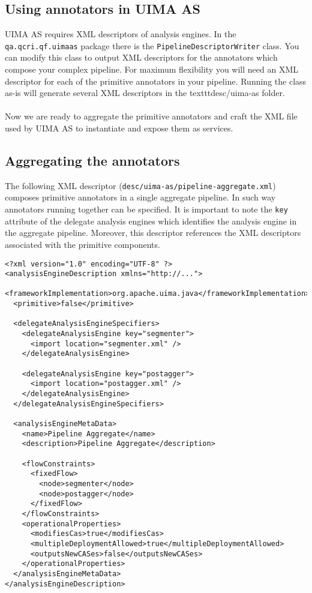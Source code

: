 \documentclass{wileysev}
\begin{document}
\subsection{Using annotators in UIMA AS}
UIMA AS requires XML descriptors of analysis engines. In the \texttt{qa.qcri.qf.uimaas} package there is the \texttt{PipelineDescriptorWriter} class. You can modify this class to output XML descriptors for the annotators which compose your complex pipeline. For maximum flexibility you will need an XML descriptor for each of the primitive annotators in your pipeline. Running the class as-is will generate several XML descriptors in the texttt{desc/uima-as} folder.
\\\\
Now we are ready to aggregate the primitive annotators and craft the XML file used by UIMA AS to instantiate and expose them as services.

\subsection{Aggregating the annotators}

The following XML descriptor (\texttt{desc/uima-as/pipeline-aggregate.xml}) composes primitive annotators in a single aggregate pipeline. In such way annotators running together can be specified. It is important to note the \texttt{key} attribute of the delegate analysis engines which identifies the analysis engine in the aggregate pipeline. Moreover, this descriptor references the XML descriptors associated with the primitive components.

\lstset{language=XML}
\begin{lstlisting}
<?xml version="1.0" encoding="UTF-8" ?>
<analysisEngineDescription xmlns="http://...">
  <frameworkImplementation>org.apache.uima.java</frameworkImplementation>
  <primitive>false</primitive>

  <delegateAnalysisEngineSpecifiers>
    <delegateAnalysisEngine key="segmenter">
      <import location="segmenter.xml" />
    </delegateAnalysisEngine>

    <delegateAnalysisEngine key="postagger">
      <import location="postagger.xml" />
    </delegateAnalysisEngine>
  </delegateAnalysisEngineSpecifiers>

  <analysisEngineMetaData>
    <name>Pipeline Aggregate</name>
    <description>Pipeline Aggregate</description>
    
    <flowConstraints>
      <fixedFlow>
        <node>segmenter</node>
        <node>postagger</node>
      </fixedFlow>
    </flowConstraints>	
    <operationalProperties>
      <modifiesCas>true</modifiesCas>
      <multipleDeploymentAllowed>true</multipleDeploymentAllowed>
      <outputsNewCASes>false</outputsNewCASes>
    </operationalProperties>
  </analysisEngineMetaData>
</analysisEngineDescription>
\end{lstlisting}
\end{document}
